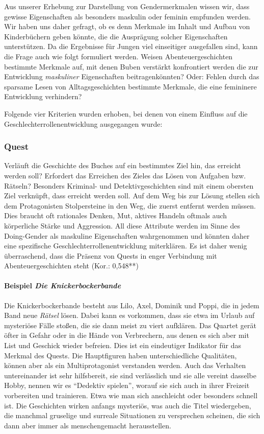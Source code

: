 Aus unserer Erhebung zur Darstellung von Gendermerkmalen wissen wir,
dass gewisse Eigenschaften als besonders maskulin oder feminin empfunden
werden. Wir haben uns daher gefragt, ob es denn Merkmale im Inhalt und
Aufbau von Kinderbüchern geben könnte, die die Ausprägung solcher
Eigenschaften unterstützen. Da die Ergebnisse für Jungen viel
einseitiger ausgefallen sind, kann die Frage auch wie folgt formuliert
werden. Weisen Abenteuergeschichten bestimmte Merkmale auf, mit denen
Buben verstärkt konfrontiert werden die zur Entwicklung
\emph{maskuliner} Eigenschaften beitragenkönnten? Oder: Fehlen durch das
sparsame Lesen von Alltagsgeschichten bestimmte Merkmale, die eine
femininere Entwicklung verhindern?

Folgende vier Kriterien wurden erhoben, bei denen von einem Einfluss auf
die Geschlechterrollenentwicklung ausgegangen wurde:

\subsubsection{Quest}

Verläuft die Geschichte des Buches auf ein bestimmtes Ziel hin, das
erreicht werden soll? Erfordert das Erreichen des Zieles das Lösen von
Aufgaben bzw. Rätseln? Besonders Kriminal- und Detektivgeschichten sind
mit einem obersten Ziel verknüpft, dass erreicht werden soll. Auf dem
Weg bis zur Lösung stellen sich dem Protagonisten Stolpersteine in den
Weg, die zuerst entfernt werden müssen. Dies braucht oft rationales
Denken, Mut, aktives Handeln oftmals auch körperliche Stärke und
Aggression. All diese Attribute werden im Sinne des Doing-Gender als
maskuline Eigenschaften wahrgenommen und könnten daher eine spezifische
Geschlechterrollenentwicklung miterklären. Es ist daher wenig
überraschend, dass die Präsenz von Quests in enger Verbindung mit
Abenteuergeschichten steht (Kor.: 0,548**)

\paragraph{Beispiel \emph{Die Knickerbockerbande}}

Die Knickerbockerbande besteht aus Lilo, Axel, Dominik und Poppi, die in
jedem Band neue \emph{Rätsel} lösen. Dabei kann es vorkommen, dass sie
etwa im Urlaub auf mysteriöse Fälle stoßen, die sie dann meist zu viert
aufklären. Das Quartet gerät öfter in Gefahr oder in die Hände von
Verbrechern, aus denen es sich aber mit List und Geschick wieder
befreien. Dies ist ein eindeutiger Indikator für das Merkmal des Quests.
Die Hauptfiguren haben unterschiedliche Qualitäten, können aber als ein
Multiprotagonist verstanden werden. Auch das Verhalten untereinander ist
sehr hilfsbereit, sie sind verlässlich und sie alle vereint dasselbe
Hobby, nennen wir es ``Dedektiv spielen'', worauf sie sich auch in ihrer
Freizeit vorbereiten und trainieren. Etwa wie man sich anschleicht oder
besonders schnell ist. Die Geschichten wirken anfangs mysteriös, was
auch die Titel wiedergeben, die manchmal gruselige und surreale
Situationen zu versprechen scheinen, die sich dann aber immer als
menschengemacht herausstellen.

